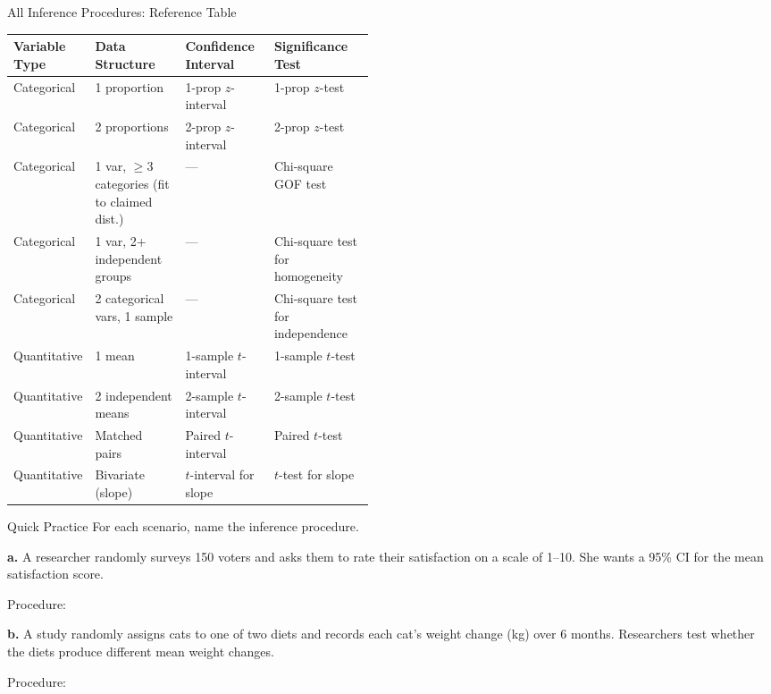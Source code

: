 \documentclass[10pt]{article}
\begin{document}
\begin{notesbox}{All Inference Procedures: Reference Table}
\renewcommand{\arraystretch}{1.6}
\begin{tabularx}{\linewidth}{@{} p{0.22\linewidth} p{0.25\linewidth} X X @{}}
  \rowcolor{sky}
  \textbf{Variable Type} & \textbf{Data Structure} & \textbf{Confidence Interval} & \textbf{Significance Test} \\
  \hline
  Categorical & 1 proportion & 1-prop $z$-interval & 1-prop $z$-test \\
  Categorical & 2 proportions & 2-prop $z$-interval & 2-prop $z$-test \\
  Categorical & 1 var, $\ge$3 categories (fit to claimed dist.) & --- & Chi-square GOF test \\
  Categorical & 1 var, 2+ independent groups & --- & Chi-square test for homogeneity \\
  Categorical & 2 categorical vars, 1 sample & --- & Chi-square test for independence \\
  Quantitative & 1 mean & 1-sample $t$-interval & 1-sample $t$-test \\
  Quantitative & 2 independent means & 2-sample $t$-interval & 2-sample $t$-test \\
  Quantitative & Matched pairs & Paired $t$-interval & Paired $t$-test \\
  Quantitative & Bivariate (slope) & $t$-interval for slope & $t$-test for slope \\
\end{tabularx}
\end{notesbox}

\begin{notesbox}{Quick Practice}
For each scenario, name the inference procedure.

\vspace{0.1in}
\textbf{a.} A researcher randomly surveys 150 voters and asks them to rate their satisfaction on a scale of 1--10. She wants a 95\% CI for the mean satisfaction score.

\hspace{0.5cm} Procedure: \blank{9cm}

\vspace{0.15in}
\textbf{b.} A study randomly assigns cats to one of two diets and records each cat's weight change (kg) over 6 months. Researchers test whether the diets produce different mean weight changes.

\hspace{0.5cm} Procedure: \blank{9cm}
\end{notesbox}
\end{document}
